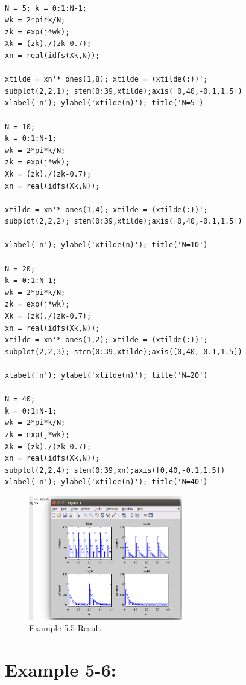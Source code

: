 \documentclass[11pt
  , a4paper
  , article
  , oneside
]{memoir}
\begin{document}
\begin{lstlisting}[style=termstyle]
% Example 5-5

N = 5; k = 0:1:N-1;
wk = 2*pi*k/N;
zk = exp(j*wk);
Xk = (zk)./(zk-0.7);
xn = real(idfs(Xk,N));

xtilde = xn'* ones(1,8); xtilde = (xtilde(:))';
subplot(2,2,1); stem(0:39,xtilde);axis([0,40,-0.1,1.5])
xlabel('n'); ylabel('xtilde(n)'); title('N=5')

N = 10;
k = 0:1:N-1;
wk = 2*pi*k/N;
zk = exp(j*wk);
Xk = (zk)./(zk-0.7);
xn = real(idfs(Xk,N));

xtilde = xn'* ones(1,4); xtilde = (xtilde(:))';
subplot(2,2,2); stem(0:39,xtilde);axis([0,40,-0.1,1.5])

xlabel('n'); ylabel('xtilde(n)'); title('N=10')

N = 20;
k = 0:1:N-1;
wk = 2*pi*k/N;
zk = exp(j*wk);
Xk = (zk)./(zk-0.7);
xn = real(idfs(Xk,N));
xtilde = xn'* ones(1,2); xtilde = (xtilde(:))';
subplot(2,2,3); stem(0:39,xtilde);axis([0,40,-0.1,1.5])

xlabel('n'); ylabel('xtilde(n)'); title('N=20')

N = 40;
k = 0:1:N-1;
wk = 2*pi*k/N;
zk = exp(j*wk);
Xk = (zk)./(zk-0.7);
xn = real(idfs(Xk,N));
subplot(2,2,4); stem(0:39,xn);axis([0,40,-0.1,1.5])
xlabel('n'); ylabel('xtilde(n)'); title('N=40')

\end{lstlisting}

\begin{figure}[h!]
	\centering
	\includegraphics[width=0.6\textwidth,height=0.4\textwidth]{./images/ex505.png}
	\caption{Example 5.5 Result}
	\label{fig:Example 5.5 Result}
\end{figure}

\chapter{Example 5-6:}
\end{document}
